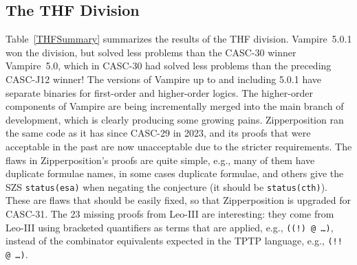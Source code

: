 \documentclass[aic]{iosart2x}
\newcommand{\smalltt}[1]{\small \texttt{#1}}
\newcommand{\LAST}{\mbox{CASC-30}}
\newcommand{\NEXT}{\mbox{CASC-31}}
\begin{document}
\subsection{The THF Division}
\label{THF}

Table~\ref{THFSummary} summarizes the results of the THF division.
Vampire~5.0.1 won the division, but solved less problems than the \LAST{} winner Vampire~5.0,
which in \LAST{} had solved less problems than the preceding CASC-J12 winner!
The versions of Vampire up to and including 5.0.1 have separate binaries for first-order and 
higher-order logics.
The higher-order components of Vampire are being incrementally merged into the main branch
of development, which is clearly producing some growing pains.
Zipperposition ran the same code as it has since CASC-29 in 2023, and its proofs that were 
acceptable in the past are now unacceptable due to the stricter requirements.
The flaws in Zipperposition's proofs are quite simple, e.g., many of them have duplicate formulae 
names, in some cases duplicate formulae, and others give the SZS \smalltt{status(esa)} when 
negating the conjecture (it should be \smalltt{status(cth)}).
These are flaws that should be easily fixed, so that Zipperposition is upgraded for \NEXT{}.
The 23 missing proofs from Leo-III are interesting: they come from Leo-III using bracketed
quantifiers as terms that are applied, e.g., \smalltt{((!)\,@\,\ldots)}, instead of the
combinator equivalents expected in the TPTP language, e.g., \smalltt{(!!\,@\,\ldots)}.
\end{document}
